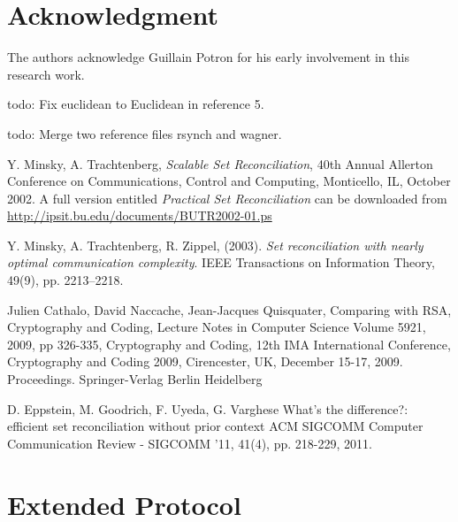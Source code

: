 \documentclass[11pt]{llncs}
\begin{document}
\section{Acknowledgment}

The authors acknowledge Guillain Potron for his early involvement in this research work.\smallskip

todo: Fix euclidean to Euclidean in reference 5.\smallskip

todo: Merge two reference files rsynch and wagner.\smallskip
\nocite{rsync}
\nocite{wagner}




\begin{thebibliography}{30}

 Y. Minsky, A. Trachtenberg, {\sl Scalable Set Reconciliation}, 40th Annual Allerton Conference on Communications, Control and Computing, Monticello, IL, October 2002. A full version entitled {\sl Practical Set Reconciliation} can be downloaded from \url{http://ipsit.bu.edu/documents/BUTR2002-01.ps}

 Y. Minsky, A. Trachtenberg, R. Zippel, (2003). {\sl Set reconciliation with nearly optimal communication complexity}. IEEE Transactions on Information Theory, 49(9), pp. 2213–2218.

 Julien Cathalo, David Naccache, Jean-Jacques Quisquater, Comparing with RSA, Cryptography and Coding, Lecture Notes in Computer Science Volume 5921, 2009, pp 326-335, Cryptography and Coding, 12th IMA International Conference, Cryptography and Coding 2009, Cirencester, UK, December 15-17, 2009. Proceedings. Springer-Verlag Berlin Heidelberg

 D. Eppstein, M. Goodrich, F. Uyeda, G. Varghese What's the difference?: efficient set reconciliation without prior context
ACM SIGCOMM Computer Communication Review - SIGCOMM '11, 41(4), pp. 218-229, 2011.


\end{thebibliography}

\appendix

\section{Extended Protocol}
\end{document}
